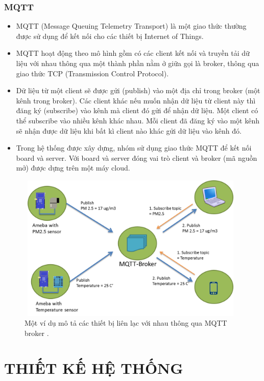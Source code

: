 \documentclass[a4paper,12pt,oneside]{article}
\begin{document}
\subsubsection{MQTT \cite{mqtt2}}
\begin{itemize}

\item MQTT (Message Queuing Telemetry Transport) là một giao thức thường được sử dụng để kết nối cho các thiết bị Internet of Things.
\item MQTT hoạt động theo mô hình gồm có các client kết nối và truyền tải dữ liệu với nhau thông qua một thành phần nằm ở giữa gọi là broker, thông qua giao thức TCP (Transmission Control Protocol).
\item Dữ liệu từ một client sẽ được gửi (publish) vào một địa chỉ trong broker (một kênh trong broker). Các client khác nếu muốn nhận dữ liệu từ client này thì đăng ký (subscribe) vào kênh mà client đó gửi để nhận dữ liệu. Một client có thể subscribe vào nhiều kênh khác nhau. Mỗi client đã đăng ký vào một kênh sẽ nhận được dữ liệu khi bất kì client nào khác gửi dữ liệu vào kênh đó.
\item Trong hệ thống được xây dựng, nhóm sử dụng giao thức MQTT để kết nối board và server. Với board và server đóng vai trò client và broker (mã nguồn mở) được dựng trên một máy cloud.
\end{itemize}

\begin{figure}[H]
	\centering
	\includegraphics[height=7cm,width=11cm]{hinh/mqtt.png}
	\caption{Một ví dụ mô tả các thiết bị liên lạc với nhau thông qua MQTT broker \cite{mqtt}.}
	\label{fig:mqtt}
\end{figure}


\newpage
\section{THIẾT KẾ HỆ THỐNG}
\end{document}
